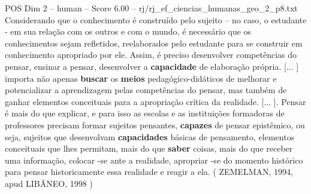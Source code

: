 \begin{textsample}{POS Dim 2 – human – Score 6.00 – rj/rj\_ef\_ciencias\_humanas\_geo\_2\_p8.txt}  \label{ex:f2_pos_017}
Considerando que o conhecimento é construído pelo sujeito – no caso, o estudante - em sua relação com os outros e com o mundo, é necessário que os conhecimentos sejam refletidos, reelaborados pelo estudante para se construir em conhecimento apropriado por ele.
Assim, é preciso desenvolver competências do pensar, ensinar a pensar, desenvolver a \textbf{capacidade} de elaboração própria. [... ] importa não apenas \textbf{buscar} os \textbf{meios} pedagógico-didáticos de melhorar e potencializar a aprendizagem pelas competências do pensar, mas também de ganhar elementos conceituais para a apropriação crítica da realidade. [... ].
Pensar é mais do que explicar, e para isso as escolas e as instituições formadoras de professores precisam formar sujeitos pensantes, \textbf{capazes} de pensar epistêmico, ou seja, sujeitos que desenvolvam \textbf{capacidades} básicas de pensamento, elementos conceituais que lhes permitam, mais do que \textbf{saber} coisas, mais do que receber uma informação, colocar -se ante a realidade, apropriar -se do momento histórico para pensar historicamente essa realidade e reagir a ela. ( ZEMELMAN, 1994, apud LIBÂNEO, 1998 )

\end{textsample}
